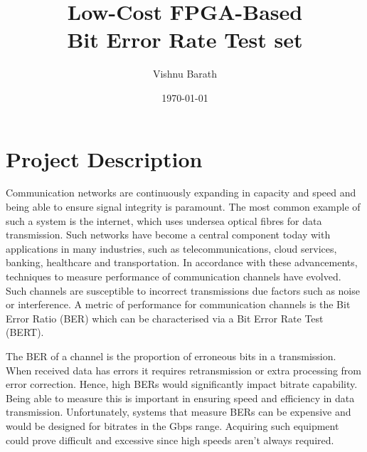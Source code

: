 \documentclass[12pt]{project_report}
\title{Low-Cost FPGA-Based\\Bit Error Rate Test set}
\author{Vishnu Barath}
\date{\today}
\begin{document}
\coverpage%
\declaration%
\maketitle


\tableofcontents

\clearpage
\section{Project Description}
    Communication networks are continuously expanding in capacity and speed and being able to ensure signal integrity is paramount.
    The most common example of such a system is the internet, which uses undersea optical fibres for data transmission.
    Such networks have become a central component today with applications in many industries, such as telecommunications, cloud services, banking, healthcare and transportation.
    In accordance with these advancements, techniques to measure  performance of communication channels have evolved.
    Such channels are susceptible to incorrect transmissions due factors such as noise or interference.
    A metric of performance for communication channels is the Bit Error Ratio (BER) which can be characterised via a Bit Error Rate Test (BERT).~\cite{SMJAlam2011}

    The BER of a channel is the proportion of erroneous bits in a transmission.
    When received data has errors it requires retransmission or extra processing from error correction.
    Hence, high BERs would significantly impact bitrate capability.~\cite{SMJAlam2011}
    Being able to measure this is important in ensuring speed and efficiency in data transmission.
    Unfortunately, systems that measure BERs can be expensive and would be designed for bitrates in the Gbps range.
    Acquiring such equipment could prove difficult and excessive since high speeds aren't always required.~\cite{MJBasford2020}
    
\end{document}
